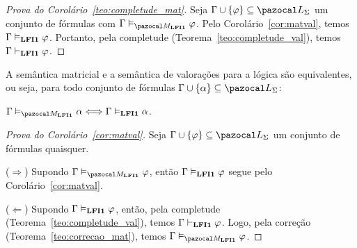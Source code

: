     \begin{proof}[Prova do Corolário~\ref{teo:completude_mat}]
        Seja $\Gamma \cup \{\phi\} \subseteq \ling{}$ um conjunto de fórmulas com $\Gamma \conmat \phi$. Pelo Corolário~\ref{cor:matval}, temos $\Gamma \vDash_{{\normalfont\textbf{LFI1}}{}} \varphi$. Portanto, pela completude (Teorema~\ref{teo:completude_val}), temos $\Gamma \vdash_{{\normalfont\textbf{LFI1}}{}} \varphi$.
    \end{proof}

    \begin{corolario}\label{cor:matvaleq}
        A semântica matricial e a semântica de valorações para a lógica {\normalfont\lfium{}} são equivalentes, ou seja, para todo conjunto de fórmulas $\Gamma \cup \{\alpha\} \subseteq \ling{}$:

        \centering
        {\normalfont{} $\Gamma \conmat \alpha \Longleftrightarrow \Gamma \conval \alpha$.}

    \end{corolario}

    \begin{proof}[Prova do Corolário~\ref{cor:matval}]
        Seja $\Gamma \cup \{\phi\} \subseteq \ling{}$ um conjunto de fórmulas quaisquer.

        \noindent ($\Longrightarrow$) Supondo $\Gamma \conmat \phi$, então $\Gamma \vDash_{{\normalfont\textbf{LFI1}}{}} \varphi$ segue pelo Corolário~\ref{cor:matval}.

        \noindent ($\Longleftarrow$) Supondo $\Gamma \vDash_{{\normalfont\textbf{LFI1}}{}} \varphi$, então, pela completude (Teorema~\ref{teo:completude_val}), temos $\Gamma \vdash_{{\normalfont\textbf{LFI1}}{}} \varphi$. Logo, pela correção (Teorema~\ref{teo:correcao_mat}), temos $\Gamma \conmat \phi$.

    \end{proof}